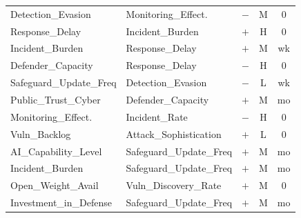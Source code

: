 \documentclass[11pt]{article}
\begin{document}
\begin{longtable}{@{}p{4.5cm}p{4.5cm}ccc@{}}
Detection\_Evasion & Monitoring\_Effect. & $-$ & M & 0 \\
Response\_Delay & Incident\_Burden & $+$ & H & 0 \\
Incident\_Burden & Response\_Delay & $+$ & M & wk \\
Defender\_Capacity & Response\_Delay & $-$ & H & 0 \\
Safeguard\_Update\_Freq & Detection\_Evasion & $-$ & L & wk \\
Public\_Trust\_Cyber & Defender\_Capacity & $+$ & M & mo \\
Monitoring\_Effect. & Incident\_Rate & $-$ & H & 0 \\
Vuln\_Backlog & Attack\_Sophistication & $+$ & L & 0 \\
AI\_Capability\_Level & Safeguard\_Update\_Freq & $+$ & M & mo \\
Incident\_Burden & Safeguard\_Update\_Freq & $+$ & M & mo \\
Open\_Weight\_Avail & Vuln\_Discovery\_Rate & $+$ & M & 0 \\
Investment\_in\_Defense & Safeguard\_Update\_Freq & $+$ & M & mo \\
\bottomrule
\end{longtable}
\end{document}
